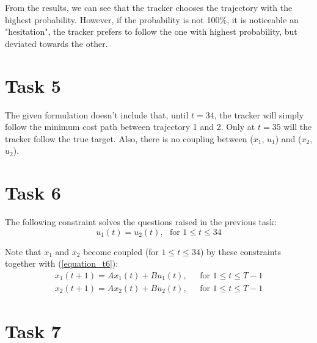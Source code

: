 \documentclass[12pt]{article}
\begin{document}
From the results, we can see that the tracker chooses the trajectory with the highest probability. However, if the probability is not 100\%, it is noticeable an "hesitation", the tracker prefers to follow the one with highest probability, but deviated towards the other. \\

\section{Task 5}

The given formulation doesn't include that, until $t = 34$, the tracker will simply follow the minimum cost path between trajectory 1 and 2. Only at $t = 35$ will the tracker follow the true target. Also, there is no coupling between ($x_1$, $u_1$) and ($x_2$, $u_2$). \\

\section{Task 6}

The following constraint solves the questions raised in the previous task: \\
\vspace{-0.3em}
\begin{equation}
    \label{equation_t6}
    u_1(t) = u_{2}(t), \> \> \> \text{for } 1 \le t \le 34
\end{equation}

Note that $x_1$ and $x_2$ become coupled (for $1 \le t \le 34$) by these constraints together with (\ref{equation_t6}): \\
\vspace{-0.3em}
\begin{align*}
    x_1(t+1) = A x_1(t) + B u_1(t), \> \> \> &\text{for } 1 \le t \le T-1 \\
    x_2(t+1) = A x_2(t) + B u_2(t), \> \> \> &\text{for } 1 \le t \le T-1
\end{align*}

\section{Task 7}
\end{document}
